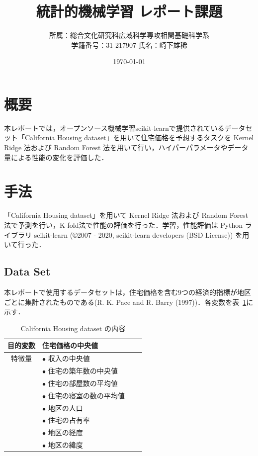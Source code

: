\documentclass[10pt,a4paper,dvipdfmx]{jsarticle}
\title{統計的機械学習 レポート課題}
\author{所属：総合文化研究科広域科学専攻相関基礎科学系\\
学籍番号：31-217907\; 氏名：崎下雄稀}
\date{\today}
\begin{document}
\maketitle

\section{概要}

本レポートでは，オープンソース機械学習scikit-learnで提供されているデータセット「California Housing dataset」を用いて住宅価格を予想するタスクを Kernel Ridge 法および Random Forest 法を用いて行い，ハイパーパラメータやデータ量による性能の変化を評価した．

\section{手法}

「California Housing dataset」を用いて Kernel Ridge 法および Random Forest 法で予測を行い，K-fold法で性能の評価を行った．学習，性能評価は Python ライブラリ scikit-learn (\copyright 2007 - 2020, scikit-learn developers (BSD License)) を用いて行った．

\subsection{Data Set}

本レポートで使用するデータセットは，住宅価格を含む9つの経済的指標が地区ごとに集計されたものである(R. K. Pace and R. Barry (1997))．各変数を表~\ref{tab:1}に示す．

\begin{table}[ht]
 \caption{California Housing dataset の内容}
 \label{tab:1}
 \centering
  \begin{tabular}{clll}
   \hline
   目的変数 & 住宅価格の中央値 \\
   \hline
   特徴量 &  $\bullet$ 収入の中央値\\
   &  $\bullet$ 住宅の築年数の中央値\\
   &  $\bullet$ 住宅の部屋数の平均値\\
   &  $\bullet$ 住宅の寝室の数の平均値\\
   &  $\bullet$ 地区の人口\\
   &  $\bullet$ 住宅の占有率\\
   &  $\bullet$ 地区の経度\\
   &  $\bullet$ 地区の緯度\\
   \hline
  \end{tabular}
\end{table}
\end{document}

